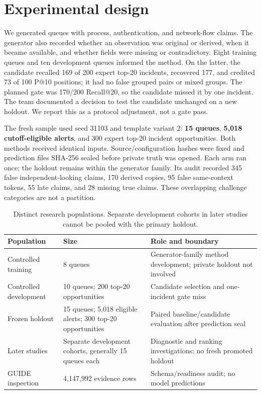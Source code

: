 \section{Experimental design}
We generated queues with process, authentication, and network-flow claims. The generator also recorded whether an observation was original or derived, when it became available, and whether fields were missing or contradictory. Eight training queues and ten development queues informed the method. On the latter, the candidate recalled 169 of 200 expert top-20 incidents, recovered 177, and credited 73 of 100 P@10 positions; it had no false grouped pairs or mixed groups. The planned gate was 170/200 Recall@20, so the candidate missed it by one incident. The team documented a decision to test the candidate unchanged on a new holdout. We report this as a protocol adjustment, not a gate pass.

The fresh sample used seed 31103 and template variant 2: \textbf{15 queues}, \textbf{5,018 cutoff-eligible alerts}, and 300 expert top-20 incident opportunities. Both methods received identical inputs. Source/configuration hashes were fixed and prediction files SHA-256 sealed before private truth was opened. Each arm ran once; the holdout remains within the generator family. Its audit recorded 345 false independent-looking claims, 170 derived copies, 95 false same-context tokens, 55 late claims, and 28 missing true claims. These overlapping challenge categories are not a partition.
\begin{table}[t]\centering\footnotesize\caption{Distinct research populations. Separate development cohorts in later studies cannot be pooled with the primary holdout.}\label{tab:cohorts}\begin{tabularx}{\textwidth}{@{}p{}p{}Y@{}}\toprule Population & Size & Role and boundary\\\midrule Controlled training & 8 queues & Generator-family method development; private holdout not involved\\ Controlled development & 10 queues; 200 top-20 opportunities & Candidate selection and one-incident gate miss\\ Frozen holdout & 15 queues; 5,018 eligible alerts; 300 top-20 opportunities & Paired baseline/candidate evaluation after prediction seal\\ Later studies & Separate development cohorts, generally 15 queues each & Diagnostic and ranking investigations; no fresh promoted holdout\\ GUIDE inspection & 4,147,992 evidence rows & Schema/readiness audit; no model predictions\\\bottomrule\end{tabularx}\end{table}
